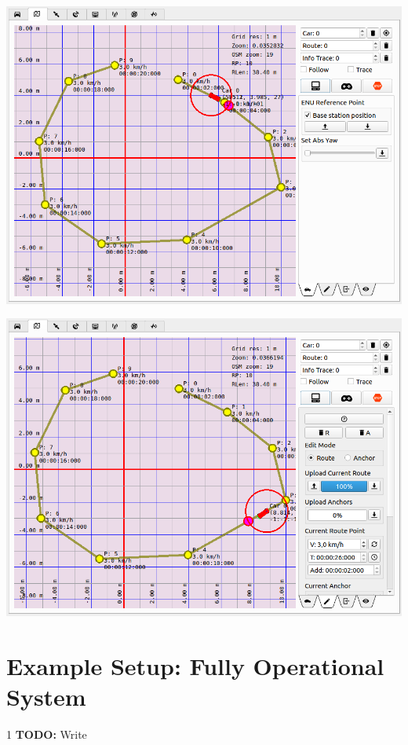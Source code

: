 \documentclass[12pt]{article} %
\def\printtodos{0}
\newcommand{\todo}[1]{
  \if\printtodos1
      {\color{red} \textbf{TODO:} #1}
  \fi}
\begin{document}
\noindent\begin{minipage}{0.5\linewidth}
\noindent \includegraphics[width=\textwidth]{./screens/autopilotdrive.png}
\end{minipage}
\begin{minipage}{0.5\linewidth}
\noindent \includegraphics[width=\textwidth]{./screens/autopilotdrive2.png}
\end{minipage}


\section{Example Setup: Fully Operational System}

\todo{Write}
\end{document}
